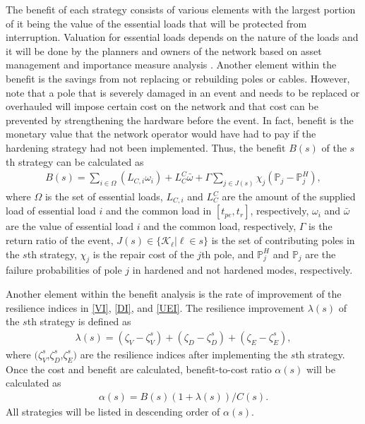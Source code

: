 \documentclass[conference]{IEEEtran}
\begin{document}
The benefit of each strategy consists of various elements with the largest portion of it being the value of the essential loads that will be protected from interruption. Valuation for essential loads depends on the nature of the loads and it will be done by the planners and owners of the network based on asset management and importance measure analysis \cite{Fang_importanceMeasure_2016}. Another element within the benefit is the savings from not replacing or rebuilding poles or cables. However, note that a pole that is severely damaged in an event and needs to be replaced or overhauled will impose certain cost on the network and that cost can be prevented by strengthening the hardware before the event. In fact, benefit is the monetary value that the network operator would have had to pay if the hardening strategy had not been implemented. Thus, the benefit $B(s)$ of the $s$th strategy can be calculated as
\begin{equation}\label{benefit}
\begin{aligned}
    B(s)=\sum_{i\in \Omega}(L_{C,i}\omega_i)+L_C^C\bar{\omega}+\Gamma \sum_{j\in J(s)}\chi_j (\mathbb{P}_j-\mathbb{P}_j^H),
\end{aligned}
\end{equation}
where $\Omega$ is the set of essential loads, $L_{C,i}$ and $L_C^C$ are the amount of the supplied load of essential load $i$ and the common load in $[t_{pe},t_r]$, respectively, $\omega_i$ and $\bar{\omega}$ are the value of essential load $i$ and the common load, respectively, $\Gamma$ is the return ratio of the event, $J(s)\in \{\mathcal{K_\ell}|\ell\in s\}$ is the set of contributing poles in the $s$th strategy, $\chi_j$ is the repair cost of the $j$th pole, and $\mathbb{P}_j^H$ and $\mathbb{P}_j$ are the failure probabilities of pole $j$ in hardened and not hardened modes, respectively.

Another element within the benefit analysis is the rate of improvement of the resilience indices in \eqref{VI}, \eqref{DI}, and \eqref{UEI}. The resilience improvement $\lambda(s)$ of the $s$th strategy is defined as
\begin{equation} \label{resilience factor}
\begin{aligned}
\lambda(s)=(\zeta_V-\zeta_V^s)+(\zeta_D-\zeta_D^s)+(\zeta_E-\zeta_E^s),
\end{aligned}
\end{equation}
where $(\zeta_V^s$,$\zeta_D^s$,$\zeta_E^s)$ are the resilience indices after implementing the $s$th strategy. Once the cost and benefit are calculated, benefit-to-cost ratio $\alpha(s)$ will be calculated as
\begin{equation} \label{cost to benefit}
\begin{aligned}
\alpha(s)={B(s)(1+\lambda(s))}/{C(s)} .
\end{aligned}
\end{equation}
 All strategies will be listed in descending order of $\alpha(s)$.
\end{document}
